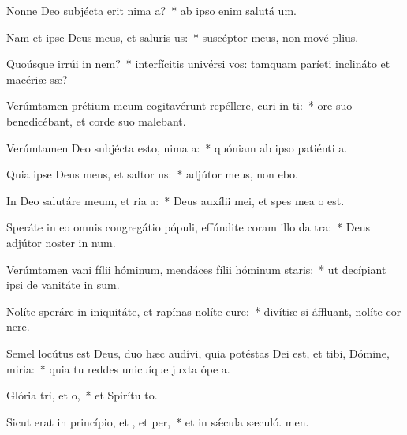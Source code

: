 \item Nonne Deo subjécta erit nima a?~* ab ipso enim salutá um.
\item Nam et ipse Deus meus, et saluris us:~* suscéptor meus, non mové plius.
\item Quoúsque irrúi in nem?~* interfícitis univérsi vos: tamquam paríeti inclináto et macériæ sæ?
\item Verúmtamen prétium meum cogitavérunt repéllere, curi in ti:~* ore suo benedicébant, et corde suo malebant.
\item Verúmtamen Deo subjécta esto, nima a:~* quóniam ab ipso patiénti a.
\item Quia ipse Deus meus, et saltor us:~* adjútor meus, non ebo.
\item In Deo salutáre meum, et ria a:~* Deus auxílii mei, et spes mea  o est.
\item Speráte in eo omnis congregátio pópuli, effúndite coram illo da tra:~* Deus adjútor noster in num.
\item Verúmtamen vani fílii hóminum, mendáces fílii hóminum  staris:~* ut decípiant ipsi de vanitáte in sum.
\item Nolíte speráre in iniquitáte, et rapínas nolíte cure:~* divítiæ si áffluant, nolíte cor nere.
\item Semel locútus est Deus, duo hæc audívi, quia potéstas Dei est, et tibi, Dómine, miria:~* quia tu reddes unicuíque juxta ópe a.
\item Glória tri, et o,~* et Spirítu to.
\item Sicut erat in princípio, et , et per,~* et in sǽcula sæculó. men.
